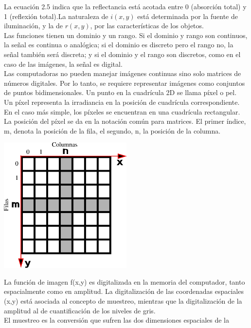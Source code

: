 La ecuación 2.5 indica que la reflectancia está acotada entre 0 (absorción total) y
1 (reflexión total).La naturaleza de $i(x,y)$ está determinada por la fuente de iluminación, y la de $r(x,y)$, por
las características de los objetos.\\
Las funciones tienen un
dominio y un rango. Si el dominio y rango son continuos, la señal es continua o
analógica; si el dominio es discreto pero el rango no, la señal también será discreta; y si
el dominio y el rango son discretos, como en el caso de las imágenes, la señal es digital.\\
Las computadoras no pueden manejar imágenes continuas sino solo matrices de números digitales. Por lo tanto, se
requiere representar imágenes como conjuntos de puntos bidimensionales. Un punto en la cuadrícula 2D se llama píxel o pel.\\
Un píxel representa la irradiancia en la posición de cuadrícula correspondiente. En el caso más simple, los píxeles se encuentran
en una cuadrícula rectangular. La posición del píxel se da en la notación común para matrices.
El primer índice, m, denota la posición de la fila, el segundo, n, la posición de la columna.
\begin{center}
	\includegraphics[width=0.5\textwidth]{Contenido/Cuerpo/Capitulo2/Fig8.eps}
	\label{fig:MarcoTeorico:Fig17}
\end{center}
La función de imagen f(x,y) es digitalizada en la memoria del computador, tanto
espacialmente como en amplitud. La digitalización de las coordenadas espaciales (x,y)
está asociada al concepto de muestreo, mientras que la digitalización de la amplitud al
de cuantificación de los niveles de gris.\cite{Book:Jose2005}
\\El muestreo es la conversión que sufren las dos dimensiones espaciales de la
